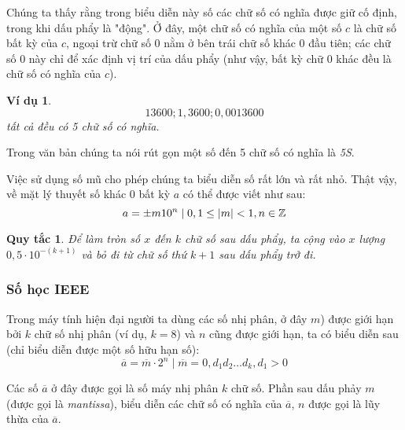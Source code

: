 \documentclass{book}    %
\DeclarePairedDelimiter\abs{\lvert}{\rvert}%
\newtheorem{exmp}{Ví dụ}[chapter]
\newtheorem*{rule_of_thumb}{Quy tắc}
\begin{document}
Chúng ta thấy rằng trong biểu diễn này số các chữ số có nghĩa được giữ cố định,
trong khi dấu phẩy là "động". Ở đây, một chữ số có nghĩa của một số \(c\) là chữ
số bất kỳ của \(c\), ngoại trừ chữ số 0 nằm ở bên trái chữ số khác 0 đầu tiên;
các chữ số 0 này chỉ để xác định vị trí của dấu phẩy (như vậy, bất kỳ chữ 0 khác
đều là chữ số có nghĩa của \(c\)).

\begin{exmp}
\begin{equation*}
    13600; 1,3600; 0,0013600
\end{equation*}
tất cả đều có 5 chữ số có nghĩa.
\end{exmp}

Trong văn bản chúng ta nói rút gọn một số đến 5 chữ số có nghĩa là \emph{5S}.

Việc sử dụng số mũ cho phép chúng ta biểu diễn số rất lớn và rất nhỏ. Thật vậy,
về mặt lý thuyết số khác 0 bất kỳ \(a\) có thể được viết như sau:
\begin{equation*}
    a = \pm m 10^n \mid 0,1 \leq \abs{m} < 1, n \in \mathbb{Z}
\end{equation*}

\begin{rule_of_thumb}
    Để làm tròn số \(x\) đến \(k\) chữ số sau dấu phẩy, ta cộng vào \(x\) lượng
    \(0,5 \cdot 10^{-(k+1)}\) và bỏ đi từ chữ số thứ \(k+1\) sau dấu phẩy trở
    đi.
\end{rule_of_thumb}

\subsubsection{Số học IEEE}

Trong máy tính hiện đại người ta dùng các số nhị phân, ở đây \(m\)) được giới
hạn bởi \(k\) chữ số nhị phân (ví dụ, \(k = 8\)) và \(n\) cũng được giới hạn, ta
có biểu diễn sau (chỉ biểu diễn được một số hữu hạn số):
\begin{equation}
    \overline{a} = \overline{m} \cdot 2^n \mid \overline{m} = 0,d_1d_2\ldots d_k, d_1 > 0
\end{equation}

Các số \(\overline{a}\) ở đây được gọi là số máy nhị phân \(k\) chữ số. Phần sau
dấu phảy \(m\) (được gọi là \emph{mantissa}), biểu diễn các chữ số có nghĩa của
\(\overline{a}\), \(n\) được gọi là lũy thừa của \(\overline{a}\).
\end{document}
